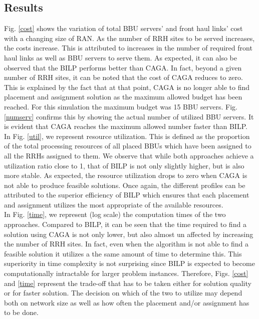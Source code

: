 \documentclass[conference]{IEEEtran}
\begin{document}
\subsection{Results}
Fig. \ref{cost} shows the variation of total BBU servers' and front haul links' cost with a changing size of RAN. As the number of RRH sites to be served increases, the costs increase. This is attributed to increases in the number of required front haul links as well as BBU servers to serve them. As expected, it can also be observed that the BILP performs better than CAGA. In fact, beyond a given number of RRH sites, it can be noted that the cost of CAGA reduces to zero. This is explained by the fact that at that point, CAGA is no longer able to find placement and assignment solution as the maximum allowed budget has been reached. For this simulation the maximum budget was 15 BBU servers. Fig. \ref{numserv} confirms this by showing the actual number of utilized BBU servers. It is evident that CAGA reaches the maximum allowed number faster than BILP.\\
\indent In Fig. \ref{util}, we represent resource utilization. This is defined as the proportion of the total processing resources of all placed BBUs which have been assigned to all the RRHs assigned to them. We observe that while both approaches achieve a utilization ratio close to 1, that of BILP is not only slightly higher, but is also more stable. As expected, the resource utilization drops to zero when CAGA is not able to produce feasible solutions. Once again, the different profiles can be attributed to the superior efficiency of BILP which ensures that each placement and assignment utilizes the most appropriate of the available resources.\\
\indent In Fig. \ref{time}, we represent (log scale) the computation times of the two approaches. Compared to BILP, it can be seen that the time required to find a solution using CAGA is not only lower, but also almost un affected by increasing the number of RRH sites. In fact, even when the algorithm is not able to find a feasible solution it utilizes a the same amount of time to determine this. This superiority in time complexity is not surprising since BILP is expected to become computationally intractable for larger problem instances. Therefore, Figs. \ref{cost} and \ref{time} represent the trade-off that has to be taken either for solution quality or for faster solution. The decision on which of the two to utilize may depend both on network size as well as how often the placement and/or assignment has to be done.\\
\end{document}
